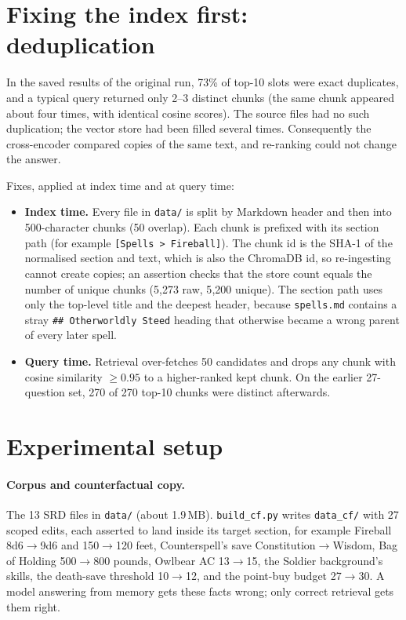 \documentclass[11pt,a4paper]{article}
\begin{document}
\section{Fixing the index first: deduplication}
In the saved results of the original run, 73\% of top-10 slots were exact duplicates, and a typical query returned only 2--3 distinct chunks (the same chunk appeared about four times, with identical cosine scores). The source files had no such duplication; the vector store had been filled several times. Consequently the cross-encoder compared copies of the same text, and re-ranking could not change the answer.

Fixes, applied at index time and at query time:
\begin{itemize}
\item \textbf{Index time.} Every file in \texttt{data/} is split by Markdown header and then into 500-character chunks (50 overlap). Each chunk is prefixed with its section path (for example \texttt{[Spells > Fireball]}). The chunk id is the SHA-1 of the normalised section and text, which is also the ChromaDB id, so re-ingesting cannot create copies; an assertion checks that the store count equals the number of unique chunks (5{,}273 raw, 5{,}200 unique). The section path uses only the top-level title and the deepest header, because \texttt{spells.md} contains a stray \texttt{\#\# Otherworldly Steed} heading that otherwise became a wrong parent of every later spell.
\item \textbf{Query time.} Retrieval over-fetches 50 candidates and drops any chunk with cosine similarity $\ge 0.95$ to a higher-ranked kept chunk. On the earlier 27-question set, 270 of 270 top-10 chunks were distinct afterwards.
\end{itemize}

\section{Experimental setup}
\paragraph{Corpus and counterfactual copy.} The 13 SRD files in \texttt{data/} (about 1.9\,MB). \texttt{build\_cf.py} writes \texttt{data\_cf/} with 27 scoped edits, each asserted to land inside its target section, for example Fireball 8d6$\to$9d6 and 150$\to$120 feet, Counterspell's save Constitution$\to$Wisdom, Bag of Holding 500$\to$800 pounds, Owlbear AC 13$\to$15, the Soldier background's skills, the death-save threshold 10$\to$12, and the point-buy budget 27$\to$30. A model answering from memory gets these facts wrong; only correct retrieval gets them right.
\end{document}

